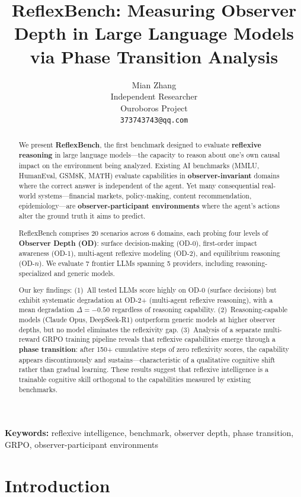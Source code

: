 \documentclass{article}
\title{ReflexBench: Measuring Observer Depth in Large Language Models\\via Phase Transition Analysis}
\author{
  Mian Zhang \\
  Independent Researcher \\
  Ouroboros Project \\
  \texttt{373743743@qq.com}
}
\begin{document}
\maketitle

\begin{abstract}
We present \textbf{ReflexBench}, the first benchmark designed to evaluate \textbf{reflexive reasoning} in large language models---the capacity to reason about one's own causal impact on the environment being analyzed. Existing AI benchmarks (MMLU, HumanEval, GSM8K, MATH) evaluate capabilities in \textbf{observer-invariant} domains where the correct answer is independent of the agent. Yet many consequential real-world systems---financial markets, policy-making, content recommendation, epidemiology---are \textbf{observer-participant environments} where the agent's actions alter the ground truth it aims to predict.

ReflexBench comprises 20 scenarios across 6 domains, each probing four levels of \textbf{Observer Depth (OD)}: surface decision-making (OD-0), first-order impact awareness (OD-1), multi-agent reflexive modeling (OD-2), and equilibrium reasoning (OD-$n$). We evaluate 7 frontier LLMs spanning 5 providers, including reasoning-specialized and generic models.

Our key findings: (1)~All tested LLMs score highly on OD-0 (surface decisions) but exhibit systematic degradation at OD-2+ (multi-agent reflexive reasoning), with a mean degradation $\Delta = -0.50$ regardless of reasoning capability. (2)~Reasoning-capable models (Claude Opus, DeepSeek-R1) outperform generic models at higher observer depths, but no model eliminates the reflexivity gap. (3)~Analysis of a separate multi-reward GRPO training pipeline reveals that reflexive capabilities emerge through a \textbf{phase transition}: after 150+ cumulative steps of zero reflexivity scores, the capability appears discontinuously and sustains---characteristic of a qualitative cognitive shift rather than gradual learning. These results suggest that reflexive intelligence is a trainable cognitive skill orthogonal to the capabilities measured by existing benchmarks.
\end{abstract}

\noindent\textbf{Keywords:} reflexive intelligence, benchmark, observer depth, phase transition, GRPO, observer-participant environments

\section{Introduction}
\label{sec:intro}
\end{document}
